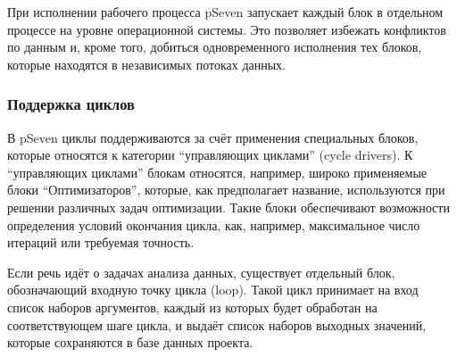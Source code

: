 При исполнении рабочего процесса \textsf{pSeven} запускает каждый блок в отдельном процессе на уровне операционной системы\cite{pSevenDocs2021}. 
Это позволяет избежать конфликтов по данным и, кроме того, добиться одновременного исполнения тех блоков, которые находятся 
в независимых потоках данных.

\subsubsection{Поддержка циклов}

В \textsf{pSeven} циклы поддерживаются за счёт применения специальных блоков, которые относятся к категории ``управляющих циклами'' (cycle drivers). К ``управляющих циклами'' блокам относятся, например, широко применяемые блоки ``Оптимизаторов'', которые, как предполагает название, используются при решении различных задач оптимизации. Такие блоки обеспечивают возможности определения условий окончания цикла, как, например, максимальное число итераций или требуемая точность. 

Если речь идёт о задачах анализа данных, существует отдельный блок, обозначающий входную точку цикла (loop). Такой цикл принимает на вход список наборов аргументов, каждый из которых будет обработан на соответствующем шаге цикла, и выдаёт список наборов выходных значений, которые сохраняются в базе данных проекта.

\noteattributes{}
